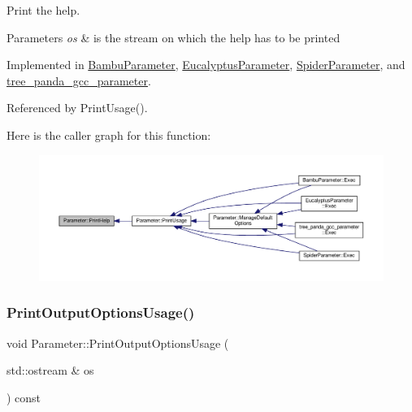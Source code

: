 Print the help. 


\begin{DoxyParams}{Parameters}
{\em os} & is the stream on which the help has to be printed \\
\hline
\end{DoxyParams}


Implemented in \hyperlink{classBambuParameter_a1bdb53362203ada5ee2dc62f66e4bae8}{Bambu\+Parameter}, \hyperlink{classEucalyptusParameter_a420b6819e64f1d3dcc1be2efeeb91467}{Eucalyptus\+Parameter}, \hyperlink{classSpiderParameter_a8021f729e9e68cdacaa9ae2105b565ba}{Spider\+Parameter}, and \hyperlink{classtree__panda__gcc__parameter_a7e40c5706de9fa5cd9fbb231876feb75}{tree\+\_\+panda\+\_\+gcc\+\_\+parameter}.



Referenced by Print\+Usage().

Here is the caller graph for this function\+:
\nopagebreak
\begin{figure}[H]
\begin{center}
\leavevmode
\includegraphics[width=350pt]{dc/dab/classParameter_a804e04bcbc2eca07deed52e112fa3321_icgraph}
\end{center}
\end{figure}
\mbox{\label{classParameter_a21a62c6800a84e42d12d8c29775d0e05}} 
\subsubsection{\texorpdfstring{Print\+Output\+Options\+Usage()}{PrintOutputOptionsUsage()}}
{\footnotesize\ttfamily void Parameter\+::\+Print\+Output\+Options\+Usage (\begin{DoxyParamCaption}\item[{std\+::ostream \&}]{os }\end{DoxyParamCaption}) const\hspace{0.3cm}{\ttfamily [protected]}}



